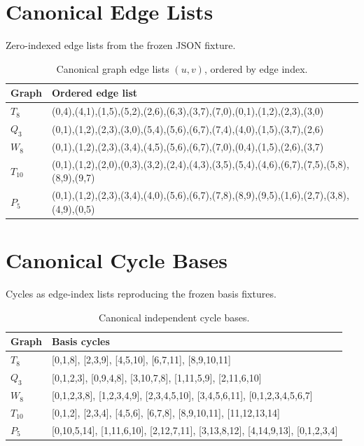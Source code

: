 \documentclass[10pt,twocolumn]{article}
\theoremstyle{definition}
\begin{document}
\appendix
\section{Canonical Edge Lists}
Zero-indexed edge lists from the frozen JSON fixture.
\begin{table}[h]
\centering\footnotesize
\caption{Canonical graph edge lists $(u,v)$, ordered by edge index.}
\begin{tabular}{@{}lp{}@{}}
\toprule Graph&Ordered edge list\\\midrule
$T_8$&(0,4),(4,1),(1,5),(5,2),(2,6),(6,3),(3,7),(7,0),(0,1),(1,2),(2,3),(3,0)\\
$Q_3$&(0,1),(1,2),(2,3),(3,0),(5,4),(5,6),(6,7),(7,4),(4,0),(1,5),(3,7),(2,6)\\
$W_8$&(0,1),(1,2),(2,3),(3,4),(4,5),(5,6),(6,7),(7,0),(0,4),(1,5),(2,6),(3,7)\\
$T_{10}$&(0,1),(1,2),(2,0),(0,3),(3,2),(2,4),(4,3),(3,5),(5,4),(4,6),(6,7),(7,5),(5,8),(8,9),(9,7)\\
$P_5$&(0,1),(1,2),(2,3),(3,4),(4,0),(5,6),(6,7),(7,8),(8,9),(9,5),(1,6),(2,7),(3,8),(4,9),(0,5)\\\bottomrule
\end{tabular}
\end{table}

\section{Canonical Cycle Bases}
Cycles as edge-index lists reproducing the frozen basis fixtures.
\begin{table}[h]
\centering\footnotesize
\caption{Canonical independent cycle bases.}
\begin{tabular}{@{}lp{}@{}}
\toprule Graph&Basis cycles\\\midrule
$T_8$&[0,1,8], [2,3,9], [4,5,10], [6,7,11], [8,9,10,11]\\
$Q_3$&[0,1,2,3], [0,9,4,8], [3,10,7,8], [1,11,5,9], [2,11,6,10]\\
$W_8$&[0,1,2,3,8], [1,2,3,4,9], [2,3,4,5,10], [3,4,5,6,11], [0,1,2,3,4,5,6,7]\\
$T_{10}$&[0,1,2], [2,3,4], [4,5,6], [6,7,8], [8,9,10,11], [11,12,13,14]\\
$P_5$&[0,10,5,14], [1,11,6,10], [2,12,7,11], [3,13,8,12], [4,14,9,13], [0,1,2,3,4]\\\bottomrule
\end{tabular}
\end{table}
\end{document}
